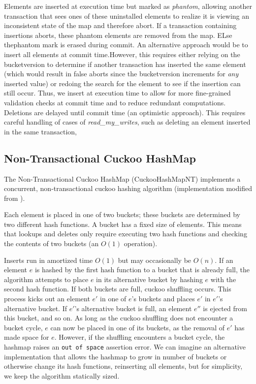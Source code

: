 Elements are inserted at execution time but marked as \emph{phantom}, allowing another transaction that sees ones of these uninstalled elements to realize it is viewing an inconsistent state of the map and therefore abort. If a transaction containing insertions aborts, these phantom elements are removed from the map. ELse thephantom mark is erased during commit. An alternative approach would be to insert all elements at commit time.However, this requires either relying on the bucketversion to determine if another transaction has inserted the same element (which would result in false aborts since the bucketversion increments for \emph{any} inserted value) or redoing the search for the element to see if the insertion can still occur. Thus, we insert at execution time to allow for more fine-grained validation checks at commit time and to reduce redundant computations. Deletions are delayed until commit time (an optimistic approach). This requires careful handling of cases of \emph{read\_my\_writes}, such as deleting an element inserted in the same transaction, 

\subsection{Non-Transactional Cuckoo HashMap}
The Non-Transactional Cuckoo HashMap (CuckooHashMapNT) implements a concurrent, non-transactional cuckoo hashing algorithm (implementation modified from \cite{cuckoocode}).

Each element is placed in one of two buckets; these buckets are determined by two different hash functions. A bucket has a fixed size of elements. This means that lookups and deletes only require executing two hash functions and checking the contents of two buckets (an $O(1)$ operation).

Inserts run in amortized time $O(1)$ but may occasionally be $O(n)$.
If an element $e$ is hashed by the first hash function to a bucket that is already full, the algorithm attempts to place $e$ in its alternative bucket by hashing $e$ with the second hash function. If both buckets are full, cuckoo shuffling occurs. This process kicks out an element $e'$ in one of $e$'s buckets and places $e'$ in $e'$'s alternative bucket. If $e'$'s alternative bucket is full, an element $e''$ is ejected from this bucket, and so on. As long as the cuckoo shuffling does not encounter a bucket cycle, $e$ can now be placed in one of its buckets, as the removal of $e'$ has made space for $e$.
However, if the shuffling encounters a bucket cycle, the hashmap raises an \texttt{out of space} assertion error. We can imagine an alternative implementation that allows the hashmap to grow in number of buckets or otherwise change its hash functions, reinserting all elements, but for simplicity, we keep the algorithm statically sized.

